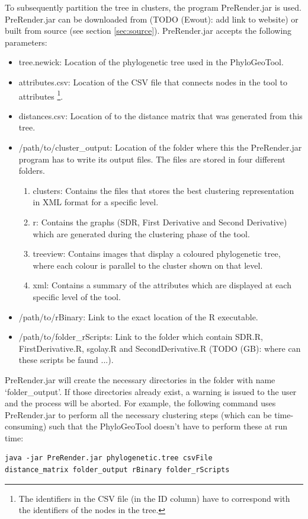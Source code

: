 \documentclass[a4paper, 11pt]{article} %
\begin{document}
To subsequently partition the tree in clusters, the program PreRender.jar is used. PreRender.jar can be downloaded from (TODO (Ewout): add link to website) or built from source (see section \ref{sec:source}). 
PreRender.jar accepts the following parameters:
\begin{itemize}
\item tree.newick: Location of the phylogenetic tree used in the PhyloGeoTool.
\item attributes.csv: Location of the CSV file that connects nodes in the tool to attributes \footnote{The identifiers in the CSV file (in the ID column) have to correspond with the identifiers of the nodes in the tree.}.
\item distances.csv: Location of to the distance matrix that was generated from this tree.
\item /path/to/cluster\_output: Location of the folder where this the PreRender.jar program has to write its output files. The files are stored in four different folders.
\begin{enumerate}
	\item clusters: Contains the files that stores the best clustering representation in XML format for a specific level.
	\item r: Contains the graphs (SDR, First Derivative and Second Derivative) which are generated during the clustering phase of the tool.
	\item treeview: Contains images that display a coloured phylogenetic tree, where each colour is parallel to the cluster shown on that level.
	\item xml: Contains a summary of the attributes which are displayed at each specific level of the tool.
\end{enumerate}
\item /path/to/rBinary: Link to the exact location of the R executable.
\item /path/to/folder\_rScripts: Link to the folder which contain SDR.R, FirstDerivative.R, sgolay.R and SecondDerivative.R (TODO (GB): where can these scripts be faund ...).
\end{itemize}
PreRender.jar will create the necessary directories in the folder with name `folder\_output'.
If those directories already exist, a warning is issued to the user and the process will be aborted.
For example, the following command uses PreRender.jar to perform all the necessary clustering steps (which can be time-consuming) such that the PhyloGeoTool doesn't have to perform these at run time: 
\begin{verbatim}
java -jar PreRender.jar phylogenetic.tree csvFile
distance_matrix folder_output rBinary folder_rScripts
\end{verbatim}
\end{document}
